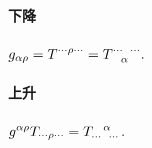 \documentclass[hidelinks]{ctexart}
\begin{document}
\paragraph{下降} %
\label{par:下降}

$\displaystyle g_{\alpha\rho} = T^{\cdots \rho \cdots} = \tensor{T}{^{\cdots}_\alpha^{\cdots}}.$


\paragraph{上升} %
\label{par:上升}

$\displaystyle g^{\alpha\rho} T_{\cdots \rho \cdots} = \tensor{T}{_{\cdots}^\alpha_{\cdots}}.$

\end{document}
